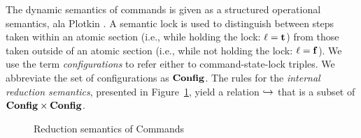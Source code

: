\documentclass[11pt]{report}
\begin{document}
The dynamic semantics of commands is given as a structured operational semantics, ala Plotkin \cite{Plotkin:NatSemTR}. A semantic lock is used to distinguish between steps taken within an atomic section (i.e., while holding the lock: $\ell = \mathbf{t}$) from those taken outside of an atomic section (i.e., while not holding the lock: $\ell = \mathbf{f}$). We use the term \emph{configurations} to refer either to command-state-lock triples. We abbreviate the set of configurations as $\mathbf{Config}$. The rules for the \emph{internal reduction semantics}, presented in Figure~\ref{fig:comm-red-rel}, yield a relation $\operatorname{\hookrightarrow}$ that is a subset of $\mathbf{Config} \times \mathbf{Config}$. 

\begin{figure}[h]
\centering
			
			\vspace{1em}


			\vspace{1em}


			\vspace{1em}

			
			\vspace{1em}
			

			\vspace{1em}
			

			\vspace{1em}

			
			\vspace{1em}
			
			
			\vspace{1em}
	

			
	\caption{Reduction semantics of Commands}
	\label{fig:comm-red-rel}
\end{figure}
\end{document}
